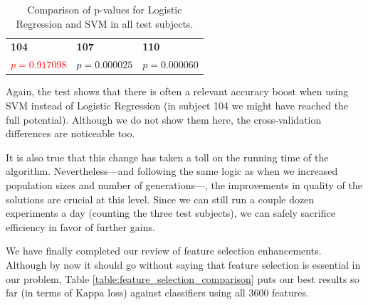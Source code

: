 \newpage

     \begin{table}[h]

        \centering
        \setlength\arrayrulewidth{0.8pt}

        \begin{tabular}{| >{\centering\arraybackslash}m{0.9in} |  >{\centering\arraybackslash}m{0.9in} | >{\centering\arraybackslash}m{0.9in} |}

        	\hline
        	\rowcolor{RoyalBlue}
        	\multicolumn{3}{| >{\centering\arraybackslash}m{3.054in} |}{\textbf{Logistic Regression against SVM}} \\
            \hline
            \rowcolor{RoyalBlue}
            \textbf{104} & \textbf{107} & \textbf{110} \\
            \hline
            \textcolor{red}{$p = 0.917098$} & $p = 0.000025$ & $p = 0.000060$ \\
            \hline

        \end{tabular}

        \caption{Comparison of p-values for Logistic Regression and SVM in all test subjects.}\label{table:models_kruskal}

    \end{table}

    Again, the test shows that there is often a relevant accuracy boost when using \acs{SVM} instead of Logistic Regression (in subject 104 we might have reached the full potential). Although we do not show them here, the cross-validation differences are noticeable too.

    It is also true that this change has taken a toll on the running time of the algorithm. Nevertheless---and following the same logic as when we increased population sizes and number of generations---, the improvements in quality of the solutions are crucial at this level. Since we can still run a couple dozen experiments a day (counting the three test subjects), we can safely sacrifice efficiency in favor of further gains.

	We have finally completed our review of feature selection enhancements. Although by now it should go without saying that feature selection is essential in our problem, Table \ref{table:feature_selection_comparison} puts our best results so far (in terms of Kappa loss) against classifiers using all 3600 features.

	\vspace{0.3cm}

